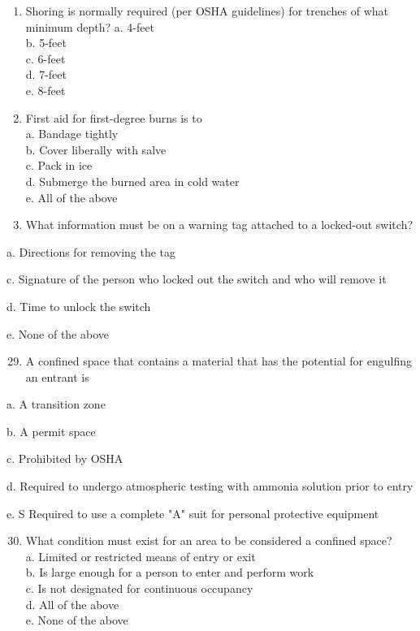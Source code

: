 \documentclass[10pt]{article}
\begin{document}
\begin{enumerate}
\begin{enumerate}
\begin{enumerate}
  \item Shoring is normally required (per OSHA guidelines) for trenches of what minimum depth?
a. 4-feet\\
b. 5-feet\\
c. 6-feet\\
d. 7-feet\\
e. 8-feet

  \item First aid for first-degree burns is to\\
a. Bandage tightly\\
b. Cover liberally with salve\\
c. Pack in ice\\
d. Submerge the burned area in cold water\\
e. All of the above\\

  \item What information must be on a warning tag attached to a locked-out switch?

\end{enumerate}

a. Directions for removing the tag

c. Signature of the person who locked out the switch and who will remove it

d. Time to unlock the switch

e. None of the above

\begin{enumerate}
  \setcounter{enumi}{28}
  \item A confined space that contains a material that has the potential for engulfing an entrant is
\end{enumerate}

a. A transition zone

b. A permit space

c. Prohibited by OSHA

d. Required to undergo atmospheric testing with ammonia solution prior to entry

e. S Required to use a complete "A" suit for personal protective equipment

\begin{enumerate}
  \setcounter{enumi}{29}
  \item What condition must exist for an area to be considered a confined space?\\
a. Limited or restricted means of entry or exit\\
b. Is large enough for a person to enter and perform work\\
c. Is not designated for continuous occupancy\\
d. All of the above\\
e. None of the above\\


\end{enumerate}
\end{enumerate}
\end{enumerate}
\end{document}
